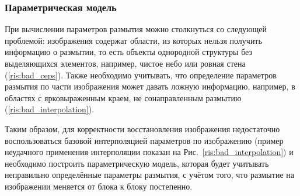 \newpage
\subsubsection{Параметрическая модель}
При вычислении параметров размытия можно столкнуться со следующей проблемой: 
изображения содержат области, из которых нельзя получить информацию о размытии, 
то есть объекты однородной структуры без выделяющихся элементов, например, 
чистое небо или ровная стена (\ref{ris:bad_ceps}). Также необходимо учитывать, что определение параметров 
размытия по части изображения может давать ложную информацию, например, в областях с ярковыраженным  краем, не сонаправленным размытию (\ref{ris:bad_interpolation}).

Таким образом, для корректности восстановления изображения недостаточно воспользоваться базовой интерполяцией параметров по изображению (пример неудачного применения интерполяции показан на Рис.~\ref{ris:bad_interpolation}) и необходимо построить параметрическую модель, 
которая будет учитывать неправильно определённые параметры размытия, с учётом того, что размытие на изображении меняется от блока к блоку постепенно.

